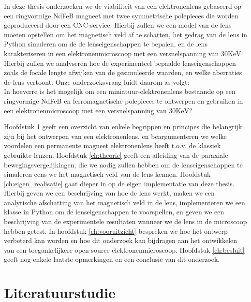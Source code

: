 \documentclass[we,twoside,openright,a4paper,11pt]{uantwerpenbamathesis}
\begin{document}
\begin{tcolorbox}[colback=gray!10!white,colframe=gray!75!black,title=Onderzoeksvraag]
    In deze thesis onderzoeken we de viabiliteit van een elektronenlens gebaseerd op een ringvormige NdFeB magneet met twee symmetrische polepieces die worden geproduceerd door een CNC-service. Hierbij zullen we een model van de lens moeten opstellen om het magnetisch veld af te schatten, het gedrag van de lens in Python simuleren om de de lenseigenschappen te bepalen, en de lens karakteriseren in een elektronenmicroscoop met een versnelspanning van $30\mathrm{KeV}$. Hierbij zullen we analyseren hoe de experimenteel bepaalde lenseigenschappen zoals de focale lengte afwijken van de gesimuleerde waarden, en welke aberraties de lens vertoont. Onze onderzoeksvraag luidt daarom as volgt:\\

    In hoeverre is het mogelijk om een miniatuur-elektronenlens bestaande op een ringvormige NdFeB en ferromagnetische polepieces te ontwerpen en gebruiken in een elektronenmicroscoop met een versnelspanning van $30\mathrm{KeV}$?\\
\end{tcolorbox}

Hoofdstuk \ref{ch:literatuur} geeft een overzicht van enkele begrippen en principes die belangrijk zijn bij het ontwerpen van een elektronenlens, en beargumenteren we welke voordelen een permanente magneet elektronenlens heeft t.o.v. de klassiek gebruikte lenzen. Hoofdstuk \ref{ch:theorie} geeft een afleiding van de paraxiale bewegingsvergelijkingen, die we nodig zullen hebben om de lenseigenschappen te simuleren eens we het magnetisch veld van de lens kennen. Hoofdstuk \ref{ch:eigen_realisatie} gaat dieper in op de eigen implementatie van deze thesis. Hierbij geven we een beschrijving van hoe de lens werkt, maken we een analytische afschatting van het magnetisch veld in de lens, implementeren we een klasse in Python om de lenseigenschappen te voorspellen, en geven we een beschrijving van de experimentele resultaten wanneer we de lens in de microscoop hebben getest. In hoofdstuk \ref{ch:vooruitzicht} bespreken we hoe het ontwerp verbeterd kan worden en hoe dit onderzoek kan bijdragen aan het ontwikkelen van een toegankelijkere open-source elektronenmicroscoop. Hoofdstuk \ref{ch:besluit} geeft nog enkele laatste opmerkingen en een conclusie van dit onderzoek.

\chapter{Literatuurstudie}\label{ch:literatuur}
\end{document}

